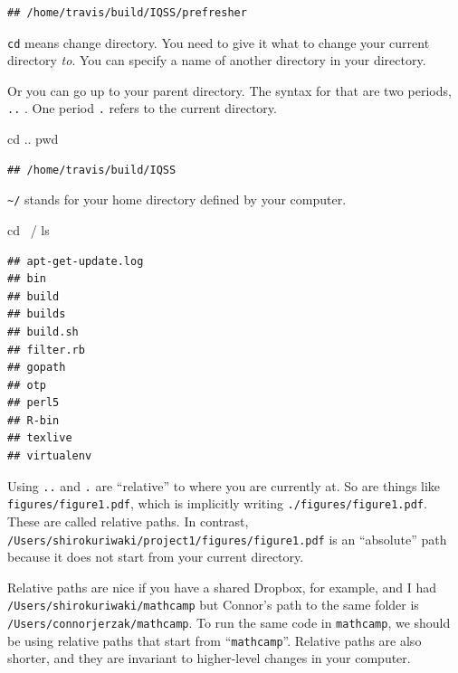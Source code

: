 \documentclass[]{book}
\newenvironment{Shaded}{\begin{snugshade}}{\end{snugshade}}
\newcommand{\FunctionTok}[1]{\textcolor[rgb]{0.00,0.00,0.00}{#1}}
\newcommand{\BuiltInTok}[1]{#1}
\newcommand{\NormalTok}[1]{#1}
\theoremstyle{definition}
\theoremstyle{definition}
\theoremstyle{definition}
\theoremstyle{remark}
\begin{document}
\begin{verbatim}
## /home/travis/build/IQSS/prefresher
\end{verbatim}

\texttt{cd} means change directory. You need to give it what to change
your current directory \emph{to}. You can specify a name of another
directory in your directory.

Or you can go up to your parent directory. The syntax for that are two
periods, \texttt{..} . One period \texttt{.} refers to the current
directory.

\begin{Shaded}
\begin{Highlighting}[]
\BuiltInTok{cd}\NormalTok{ ..}
\BuiltInTok{pwd}
\end{Highlighting}
\end{Shaded}

\begin{verbatim}
## /home/travis/build/IQSS
\end{verbatim}

\texttt{\textasciitilde{}/} stands for your home directory defined by
your computer.

\begin{Shaded}
\begin{Highlighting}[]
\BuiltInTok{cd}\NormalTok{ ~/}
\FunctionTok{ls}
\end{Highlighting}
\end{Shaded}

\begin{verbatim}
## apt-get-update.log
## bin
## build
## builds
## build.sh
## filter.rb
## gopath
## otp
## perl5
## R-bin
## texlive
## virtualenv
\end{verbatim}

Using \texttt{..} and \texttt{.} are ``relative'' to where you are
currently at. So are things like \texttt{figures/figure1.pdf}, which is
implicitly writing \texttt{./figures/figure1.pdf}. These are called
relative paths. In contrast,
\texttt{/Users/shirokuriwaki/project1/figures/figure1.pdf} is an
``absolute'' path because it does not start from your current directory.

Relative paths are nice if you have a shared Dropbox, for example, and I
had \texttt{/Users/shirokuriwaki/mathcamp} but Connor's path to the same
folder is \texttt{/Users/connorjerzak/mathcamp}. To run the same code in
\texttt{mathcamp}, we should be using relative paths that start from
``\texttt{mathcamp}''. Relative paths are also shorter, and they are
invariant to higher-level changes in your computer.
\end{document}
